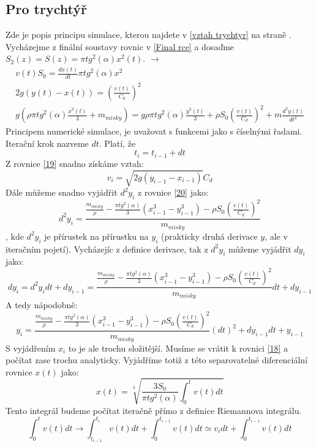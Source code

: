 \documentclass[14pt,a4paper]{article}
\begin{document}
\subsection{Pro trychtýř}
\label{rovnice trychtyr}
Zde je popis principu simulace, kterou najdete v \ref{vztah trychtyr} na straně \pageref{vztah trychtyr}.\\ Vycházejme z finální soustavy rovnic v \ref{Final rce} a dosaďme $S_2(z)=S(z)=\pi tg^2(\alpha)x^2(t)$. \quad $\rightarrow$
\begin{gather} 
\label{18}
v(t)S_0=\frac{dx(t)}{dt}\pi tg^2(\alpha)x^2\\
\label{19}
2g(y(t)-x(t))=\left(\frac{v(t)}{C_d}\right)^2\\
\label{20}
g\left(\rho\pi tg^2(\alpha)  \frac{x^{3}(t)}{3} +m_{misky}\right)=g \rho \pi tg^2(\alpha) \frac{y^{3}(t)}{3} +\rho S_0\left(\frac{v(t)}{C_d}\right)^2+m \frac{d^2y(t)}{dt^2}
\end{gather}
Principem numerické simulace, je uvažovat s funkcemi jako s číselnými řadami. Iterační krok nazveme $dt$. Platí, že 
\begin{equation}
t_i=t_{i-1}+dt
\end{equation}
Z rovnice \ref{19} snadno získáme vztah:
\begin{equation}
v_i=\sqrt{2g(y_{i-1}-x_{i-1})}C_d
\end{equation}
Dále můžeme snadno vyjádřit $d^{2}y_i$ z rovnice \ref{20} jako:
$$d^{2}y_i=\frac{\frac{m_{misky}}{\rho}-\frac{\pi tg^{2}(\alpha)}{3}\left(x^{3}_{i-1}-y^{3}_{i-1}\right)-\rho S_0\left(\frac{v(t)}{C_d}\right)^2}{m_{misky}}$$
, kde $d^{2}y_i$ je přírustek na přírustku na $y_i$ (prakticky druhá derivace $y$, ale v iteračním pojetí).
Vycházejíc z definice derivace, tak z $d^{2}y_i$ můžeme vyjádřit $dy_i$ jako: $$ dy_i=d^{2}y_idt+dy_{i-1}=\frac{\frac{m_{misky}}{\rho}-\frac{\pi tg^{2}(\alpha)}{3}\left(x^{3}_{i-1}-y^{3}_{i-1}\right)-\rho S_0\left(\frac{v(t)}{C_d}\right)^2}{m_{misky}}dt+dy_{i-1}$$
A tedy nápodobně:
\begin{equation}
y_i=\frac{\frac{m_{misky}}{\rho}-\frac{\pi tg^{2}(\alpha)}{3}\left(x^{3}_{i-1}-y^{3}_{i-1}\right)-\rho S_0\left(\frac{v(t)}{C_d}\right)^2}{m_{misky}}(dt)^{2}+dy_{i-1}dt+y_{i-1}
\end{equation}
S vyjádřením $x_i$ to je ale trochu složitější. Musíme se vrátit k rovnici \ref{18} a počítat zase trochu analyticky. Vyjádříme totiž z této separovatelné diferenciální rovnice $x(t)$ jako: $$x(t)=\sqrt[3]{\frac{3S_0}{\pi tg^2(\alpha)} \int_0^t v(t)dt}$$
Tento integrál budeme počítat iteračně přímo z definice Riemannova integrálu. $$\int_0^t v(t)dt \rightarrow \int_{t_{i-1}}^{t_{i}} v(t)dt + \int_{0}^{t_{i-1}} v(t)dt \simeq v_idt+\int_{0}^{t_{i-1}} v(t)dt$$ 
\end{document}
